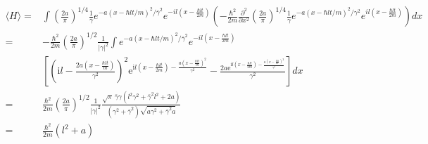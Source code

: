 \begin{align*}
    \langle H\rangle
    =&
    \int 
    \left(\frac{2a}{\pi}\right)^{1/4}
\frac{1}{\bar{\gamma}}
e^{-a(x-\hbar lt/m)^2/\bar{\gamma}^2}
e^{-il(x-\frac{\hbar lt}{2m})}
\left(
-\frac{\hbar^2}{2m}
\frac{\partial^2}{\partial x^2}
\left(\frac{2a}{\pi}\right)^{1/4}
\frac{1}{\gamma}
e^{-a(x-\hbar lt/m)^2/\gamma^2}
e^{il(x-\frac{\hbar lt}{2m})}
\right)dx\\
=&-\frac{\hbar^2}{2m}\left(\frac{2a}{\pi}\right)^{1/2}
\frac{1}{|\gamma|^2}
\int
e^{-a(x-\hbar lt/m)^2/\bar{\gamma}^2}
e^{-il(x-\frac{\hbar lt}{2m})}\\
&
\left[
\left(\mathrm{i}l - \frac{2a \left(x - \frac{\hbar lt}{m}\right)}{{\gamma}^{2}}\right)^{2} \mathrm{e}^{\mathrm{i}l \left(x - \frac{\hbar lt}{2m}\right) - \frac{a \left(x - \frac{\hbar lt}{m}\right)^{2}}{{\gamma}^{2}}} - \frac{2a\mathrm{e}^{\mathrm{i}l \left(x - \frac{\hbar lt}{2m}\right) - \frac{a \left(x - \frac{\hbar lt}{m}\right)^{2}}{{\gamma}^{2}}}}{{\gamma}^{2}}
\right]dx\\
=&
\frac{\hbar^2}{2m}\left(\frac{2a}{\pi}\right)^{1/2}
\frac{1}{|\gamma|^2}
\frac{\sqrt{\pi} \, \bar{\gamma}{\gamma} \left(l^{2} {\gamma}^{2} + \bar{\gamma}^{2} l^{2} + 2a\right)}{\left({\gamma}^{2} + \bar{\gamma}^{2}\right) 
\sqrt{a{\gamma}^{2} + \bar{\gamma}^{2} a}}\\
=&
\frac{\hbar^2}{2m}
(l^2+a)
\end{align*}

